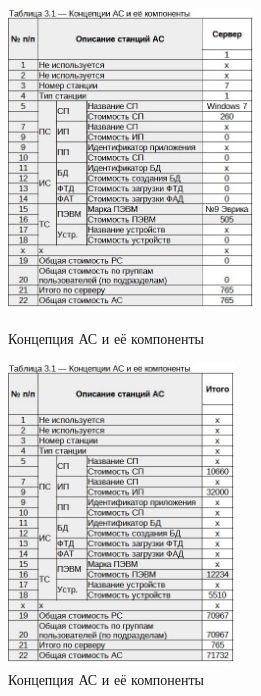 \documentclass[12pt, a4paper, simple]{eskdtext}
\begin{document}
    \begin{figure}[!hp]
        \begin{minipage}{0.48\textwidth}
            \centering
            \includegraphics[height=8cm]
            {_docs/Таблица3-1КонцепцияАСИЕеКомпоненты__лаб2_С1.jpg}
            \caption{Концепция АС и её компоненты}
        \end{minipage}
        \begin{minipage}{0.48\textwidth}
            \centering
            \includegraphics[height=8cm]
            {_docs/Таблица3-1КонцепцияАСИЕеКомпоненты__лаб2.jpg}
            \caption{Концепция АС и её компоненты}
        \end{minipage}
     \end{figure}
\end{document}
